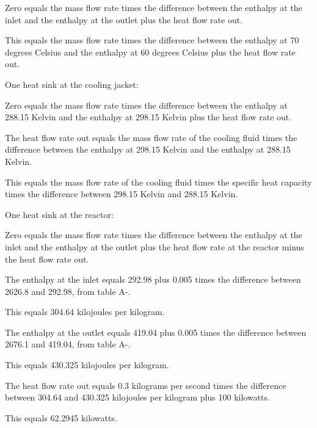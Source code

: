 Zero equals the mass flow rate times the difference between the enthalpy at the inlet and the enthalpy at the outlet plus the heat flow rate out.

This equals the mass flow rate times the difference between the enthalpy at 70 degrees Celsius and the enthalpy at 60 degrees Celsius plus the heat flow rate out.

One heat sink at the cooling jacket:

Zero equals the mass flow rate times the difference between the enthalpy at 288.15 Kelvin and the enthalpy at 298.15 Kelvin plus the heat flow rate out.

The heat flow rate out equals the mass flow rate of the cooling fluid times the difference between the enthalpy at 298.15 Kelvin and the enthalpy at 288.15 Kelvin.

This equals the mass flow rate of the cooling fluid times the specific heat capacity times the difference between 298.15 Kelvin and 288.15 Kelvin.

One heat sink at the reactor:

Zero equals the mass flow rate times the difference between the enthalpy at the inlet and the enthalpy at the outlet plus the heat flow rate at the reactor minus the heat flow rate out.

The enthalpy at the inlet equals 292.98 plus 0.005 times the difference between 2626.8 and 292.98, from table A-.

This equals 304.64 kilojoules per kilogram.

The enthalpy at the outlet equals 419.04 plus 0.005 times the difference between 2676.1 and 419.04, from table A-.

This equals 430.325 kilojoules per kilogram.

The heat flow rate out equals 0.3 kilograms per second times the difference between 304.64 and 430.325 kilojoules per kilogram plus 100 kilowatts.

This equals 62.2945 kilowatts.